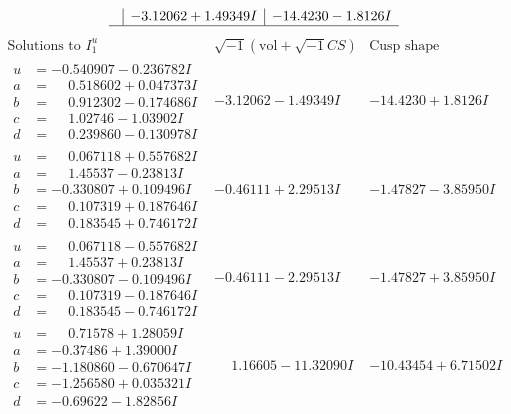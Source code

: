 \documentclass[1p]{elsarticle_modified}
\theoremstyle{definition}
\newcommand{\I}{\sqrt{-1}}
\begin{document}
$$\begin{array}{c|c|c}
 & -3.12062 + 1.49349 I & -14.4230 - 1.8126 I\\
 \hline 
 \end{array}$$\newpage$$\begin{array}{c|c|c}  
\text{Solutions to }I^u_{1}& \I (\text{vol} + \sqrt{-1}CS) & \text{Cusp shape}\\
 \hline 
\begin{aligned}
u &= -0.540907 - 0.236782 I \\
a &= \phantom{-}0.518602 + 0.047373 I \\
b &= \phantom{-}0.912302 - 0.174686 I \\
c &= \phantom{-}1.02746 - 1.03902 I \\
d &= \phantom{-}0.239860 - 0.130978 I\end{aligned}
 & -3.12062 - 1.49349 I & -14.4230 + 1.8126 I \\ \hline\begin{aligned}
u &= \phantom{-}0.067118 + 0.557682 I \\
a &= \phantom{-}1.45537 - 0.23813 I \\
b &= -0.330807 + 0.109496 I \\
c &= \phantom{-}0.107319 + 0.187646 I \\
d &= \phantom{-}0.183545 + 0.746172 I\end{aligned}
 & -0.46111 + 2.29513 I & -1.47827 - 3.85950 I \\ \hline\begin{aligned}
u &= \phantom{-}0.067118 - 0.557682 I \\
a &= \phantom{-}1.45537 + 0.23813 I \\
b &= -0.330807 - 0.109496 I \\
c &= \phantom{-}0.107319 - 0.187646 I \\
d &= \phantom{-}0.183545 - 0.746172 I\end{aligned}
 & -0.46111 - 2.29513 I & -1.47827 + 3.85950 I \\ \hline\begin{aligned}
u &= \phantom{-}0.71578 + 1.28059 I \\
a &= -0.37486 + 1.39000 I \\
b &= -1.180860 - 0.670647 I \\
c &= -1.256580 + 0.035321 I \\
d &= -0.69622 - 1.82856 I\end{aligned}
 & \phantom{-}1.16605 - 11.32090 I & -10.43454 + 6.71502 I \\ \hline\begin{aligned}

\end{aligned}
\end{array}$$
\end{document}
